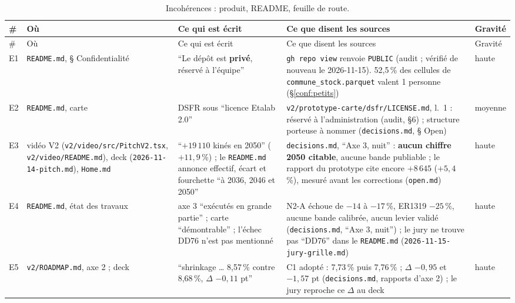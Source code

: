 \begin{small}
\setlength{\LTleft}{0pt}
\begin{longtable}{@{}p{}p{}p{}p{}p{}@{}}
\caption{Incohérences : produit, README, feuille de route.}\label{pro:tab-inc-e}\\
\toprule \# & Où & Ce qui est écrit & Ce que disent les sources & Gravité \\ \midrule\endfirsthead
\toprule \# & Où & Ce qui est écrit & Ce que disent les sources & Gravité \\ \midrule\endhead
\bottomrule\endfoot
E1 & \texttt{README.md}, § Confidentialité & \enquote{Le dépôt est \textbf{privé}, réservé à l'équipe} & \texttt{gh repo view} renvoie \texttt{PUBLIC}\mesure{} (audit ; vérifié de nouveau le 2026-11-15). 52,5\mesure{}\,\% des cellules de \texttt{commune\_\allowbreak{}stock.parquet} valent 1 personne (§\ref{conf:petits}) & haute \\
E2 & \texttt{README.md}, carte & DSFR sous \enquote{licence Etalab 2.0} & \texttt{v2/\allowbreak{}prototype-\allowbreak{}carte/\allowbreak{}dsfr/\allowbreak{}LICENSE.md}, l.~1 : réservé à l'administration (audit, §6) ; structure porteuse à nommer (\texttt{decisions.md}, § Open) & moyenne \\
E3 & vidéo V2 (\texttt{v2/\allowbreak{}video/\allowbreak{}src/\allowbreak{}PitchV2.tsx}, \texttt{v2/\allowbreak{}video/\allowbreak{}README.md}), deck (\texttt{2026-\allowbreak{}11-\allowbreak{}14-\allowbreak{}pitch.md}), \texttt{Home.md} & \enquote{$+19\,110$ kinés en 2050} ($+11{,}9$\,\%) ; le \texttt{README.md} annonce effectif, écart et fourchette \enquote{à 2036, 2046 et 2050} & \texttt{decisions.md}, \enquote{Axe 3, nuit} : \textbf{aucun chiffre 2050 citable}, aucune bande publiable ; le rapport du prototype cite encore $+8\,645$\mesure{} ($+5{,}4$\,\%), mesuré avant les corrections (\texttt{open.md}) & haute \\
E4 & \texttt{README.md}, état des travaux & axe 3 \enquote{exécutés en grande partie} ; carte \enquote{démontrable} ; l'échec DD76 n'est pas mentionné & N2-A échoue de $-14$ à $-17$\mesure{}\,\%, ER1319 $-25$\mesure{}\,\%, aucune bande calibrée, aucun levier validé (\texttt{decisions.md}, \enquote{Axe 3, nuit}) ; le jury ne trouve pas \enquote{DD76} dans le \texttt{README.md} (\texttt{2026-\allowbreak{}11-\allowbreak{}15-\allowbreak{}jury-\allowbreak{}grille.md}) & haute \\
E5 & \texttt{v2/\allowbreak{}ROADMAP.md}, axe 2 ; deck & \enquote{shrinkage \ldots{} 8,57\,\% contre 8,68\,\%, $\Delta$ $-0{,}11$ pt} & C1 adopté : 7,73\mesure{}\,\% puis 7,76\mesure{}\,\% ; $\Delta$ $-0{,}95$\mesure{} et $-1{,}57$\derive{} pt (\texttt{decisions.md}, rapports d'axe 2) ; le jury reproche ce $\Delta$ au deck & haute \\

\end{longtable}
\end{small}
